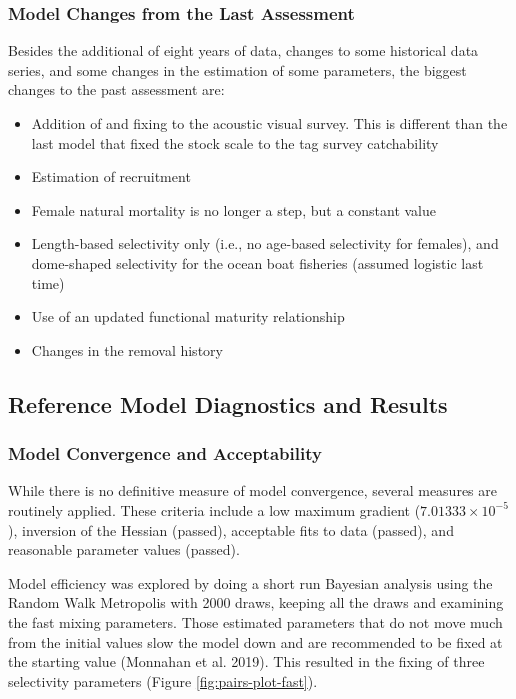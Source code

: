 \documentclass[11pt,
  english,
  letterpaper,
]{article}
\providecommand{\tightlist}{%
  \setlength{\itemsep}{0pt}\setlength{\parskip}{0pt}}
\providecommand{\tightlist}{%
  \setlength{\itemsep}{0pt}\setlength{\parskip}{0pt}}
\begin{document}
\hypertarget{model-changes-from-the-last-assessment}{%
\subsubsection{Model Changes from the Last Assessment}\label{model-changes-from-the-last-assessment}}

Besides the additional of eight years of data, changes to some historical data series, and some changes in the estimation of some parameters, the biggest changes to the past assessment are:

\begin{itemize}
\tightlist
\item
  Addition of and fixing to the acoustic visual survey. This is different than the last model that fixed the stock scale to the tag survey catchability
\item
  Estimation of recruitment
\item
  Female natural mortality is no longer a step, but a constant value
\item
  Length-based selectivity only (i.e., no age-based selectivity for females), and dome-shaped selectivity for the ocean boat fisheries (assumed logistic last time)
\item
  Use of an updated functional maturity relationship
\item
  Changes in the removal history
\end{itemize}

\hypertarget{reference-model-diagnostics-and-results}{%
\subsection{Reference Model Diagnostics and Results}\label{reference-model-diagnostics-and-results}}

\hypertarget{model-convergence-and-acceptability}{%
\subsubsection{Model Convergence and Acceptability}\label{model-convergence-and-acceptability}}

While there is no definitive measure of model convergence, several measures are routinely applied. These criteria include a low maximum gradient (\ensuremath{7.01333\times 10^{-5}}), inversion of the Hessian (passed), acceptable fits to data (passed), and reasonable parameter values (passed).

Model efficiency was explored by doing a short run Bayesian analysis using the Random Walk Metropolis with 2000 draws, keeping all the draws and examining the fast mixing parameters. Those estimated parameters that do not move much from the initial values slow the model down and are recommended to be fixed at the starting value (Monnahan et al. 2019). This resulted in the fixing of three selectivity parameters (Figure \ref{fig:pairs-plot-fast}).
\end{document}
